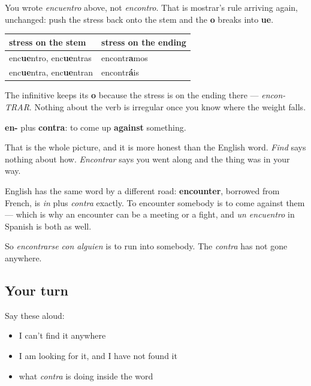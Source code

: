\begin{grammarlens}[title={Grammar Lens: the o that breaks}]
You wrote \emph{encuentro} above, not \emph{encontro}. That is mostrar's rule arriving again, unchanged: push the stress back onto the stem and the \textbf{o} breaks into \textbf{ue}.

\noindent
\begin{tabularx}{\linewidth}{@{}>{\raggedright\arraybackslash}X>{\raggedright\arraybackslash}X@{}}
\toprule
\textbf{stress on the stem} & \textbf{stress on the ending} \\
\midrule
enc\textbf{ue}ntro, enc\textbf{ue}ntras & encontr\textbf{a}mos \\
enc\textbf{ue}ntra, enc\textbf{ue}ntran & encontr\textbf{á}is \\
\bottomrule
\end{tabularx}

The infinitive keeps its \textbf{o} because the stress is on the ending there — \emph{encon-TRAR}. Nothing about the verb is irregular once you know where the weight falls.
\end{grammarlens}

\begin{cousinweb}
\textbf{en-} plus \textbf{contra}: to come up \textbf{against} something.

That is the whole picture, and it is more honest than the English word. \emph{Find} says nothing about how. \emph{Encontrar} says you went along and the thing was in your way.

English has the same word by a different road: \textbf{encounter}, borrowed from French, is \emph{in} plus \emph{contra} exactly. To encounter somebody is to come against them — which is why an encounter can be a meeting or a fight, and \emph{un encuentro} in Spanish is both as well.

So \emph{encontrarse con alguien} is to run into somebody. The \emph{contra} has not gone anywhere.
\end{cousinweb}

\subsection*{Your turn}
Say these aloud:

\begin{itemize}
\raggedright
  \item I can't find it anywhere
  \item I am looking for it, and I have not found it
  \item what \emph{contra} is doing inside the word
\end{itemize}

